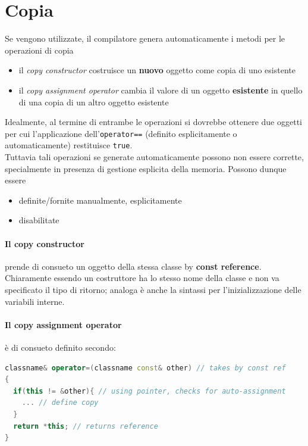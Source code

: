 \documentclass[10pt, oneside]{book}
\begin{document}
\section{Copia}
Se vengono utilizzate, il compilatore genera automaticamente i metodi per le operazioni di copia
\begin{itemize}
\item il \textit{copy constructor} costruisce un \textbf{nuovo} oggetto come copia di uno esistente
\item il \textit{copy assignment operator} cambia il valore di un oggetto \textbf{esistente} in quello di una copia di un altro oggetto esistente
\end{itemize}
Idealmente, al termine di entrambe le operazioni si dovrebbe ottenere due oggetti per cui l'applicazione dell'\texttt{operator==} (definito esplicitamente o automaticamente) restituisce \texttt{true}.\\
Tuttavia tali operazioni se generate automaticamente possono non essere corrette, specialmente in presenza di gestione esplicita della memoria. Possono dunque essere
\begin{itemize}
\item definite/fornite manualmente, esplicitamente
\item disabilitate
\end{itemize}

\paragraph{Il copy constructor} prende di consueto un oggetto della stessa classe by \textbf{const reference}. Chiaramente essendo un costruttore ha lo stesso nome della classe e non va specificato il tipo di ritorno; analoga è anche la sintassi per l'inizializzazione delle variabili interne.

\paragraph{Il copy assignment operator} è di consueto definito secondo:
\begin{lstlisting}[language=C++]
classname& operator=(classname const& other) // takes by const ref
{
  if(this != &other){ // using pointer, checks for auto-assignment
    ... // define copy
  }
  return *this; // returns reference
}
\end{lstlisting}
\end{document}
